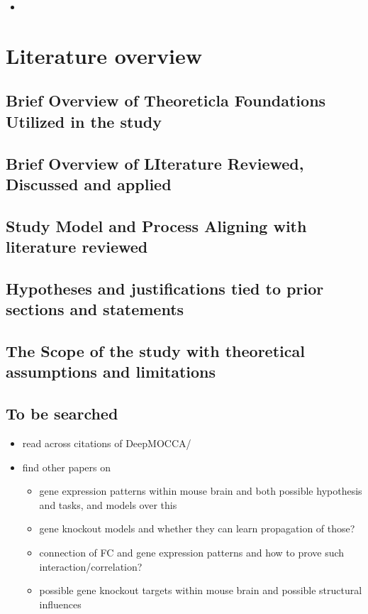 \documentclass[]{article}
\begin{document}
\begin{itemize}
	\item 
\end{itemize}

\section{Literature overview}

\subsection*{Brief Overview of Theoreticla Foundations Utilized in the study}

\subsection*{Brief Overview of LIterature Reviewed, Discussed and applied}

\subsection*{Study Model and Process Aligning with literature reviewed}

\subsection*{Hypotheses and justifications tied to prior sections and statements}

\subsection*{The Scope of the study with theoretical assumptions and limitations}

\subsection{To be searched}
\begin{itemize}
	\item read across citations of DeepMOCCA/\citet{takata_flexible_2021}
	\item find other papers on
	\begin{itemize}
		\item gene expression patterns within mouse brain and both possible hypothesis and tasks, and models over this
		\item gene knockout models and whether they can learn propagation of those?
		\item connection of FC and gene expression patterns and how to prove such interaction/correlation?
		\item possible gene knockout targets within mouse brain and possible structural influences
	\end{itemize}
\end{itemize}
\end{document}
